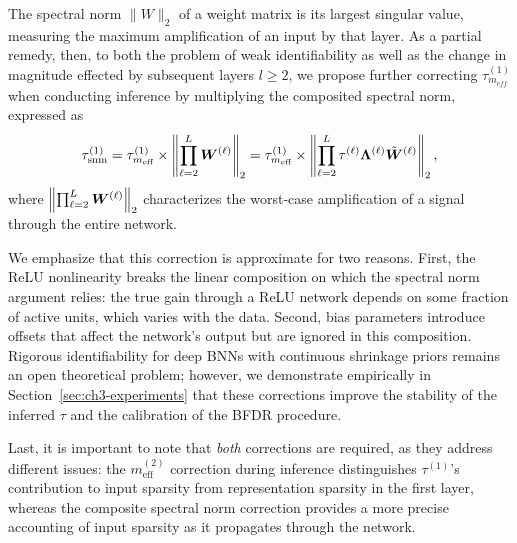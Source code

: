 The spectral norm $\|W\|_2$ of a weight matrix is its largest singular value, measuring
the maximum amplification of an input by that layer.  As a partial remedy, then, to both the problem of weak identifiability as well as the change in magnitude effected by subsequent layers $l \geq 2$, we propose further correcting $\tau_{m_{eff}}^{(1)}$ when conducting inference by multiplying the composited spectral norm, expressed as 
\begin{equation}
    \tau_{\text{snm}}^{(1)} 
    = \tau_{m_\text{eff}}^{(1)} \times
        \left\| 
            \prod_{\ell=2}^L  \bm{W}^{(\ell)}
        \right\|_2 
    = \tau_{m_\text{eff}}^{(1)} \times       
        \left\|
            \prod_{\ell=2}^L
            \tau^{(\ell)} \bm\Lambda^{(\ell)} \tilde {\bm{W}}^{(\ell)}
        \right\|_2,
    \label{eq:compsn}
\end{equation}
where $\left\| \prod_{\ell=2}^L \bm{W}^{(\ell)} \right\|_2$ characterizes the worst-case amplification of a signal through the entire network.

We emphasize that this correction is approximate for two reasons.
First, the ReLU nonlinearity breaks the linear composition on
which the spectral norm argument relies: the true gain through
a ReLU network depends on some fraction of active units, which
varies with the data.  Second, bias parameters introduce
offsets that affect the network's output but are ignored in this composition.  
Rigorous identifiability for deep BNNs with continuous shrinkage priors remains an open
theoretical problem; however, we demonstrate empirically in
Section~\ref{sec:ch3-experiments} that these corrections improve
the stability of the inferred $\tau$ and the calibration of the
BFDR procedure. 

Last, it is important to note that \textit{both} corrections are required, 
as they address different issues: 
the $m^{(2)}_\text{eff}$ correction during inference distinguishes 
$\tau^{(1)}$'s contribution to input sparsity from representation sparsity
in the first layer, whereas the composite spectral norm correction 
provides a more precise accounting of input sparsity as it 
propagates through the network.




